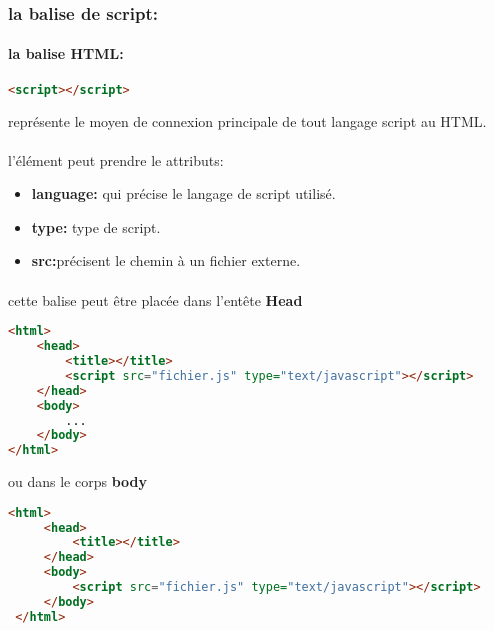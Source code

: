 \subsubsection{la balise de script:}
\paragraph{la balise HTML:} 
\begin{lstlisting}[language=html]
	<script></script>	
\end{lstlisting}
 représente le moyen de connexion principale de tout langage script au HTML.
\paragraph{}
l'élément peut prendre le attributs:
\begin{itemize}
	\item \textbf{language:} qui précise le langage de script utilisé.
	\item \textbf{type:} type de script.
	\item \textbf{src:}précisent le chemin à un fichier externe.
\end{itemize}
\paragraph{}
cette balise peut être placée dans l'entête \textbf{Head}
\begin{lstlisting}[language=html]
<html>
	<head>
		<title></title>
		<script src="fichier.js" type="text/javascript"></script>	
	</head>	
	<body>	
		...	
	</body>	
</html>
\end{lstlisting}
 ou dans le corps \textbf{body}
 \begin{lstlisting}[language=html]
 <html>
	 <head>
		 <title></title>	
	 </head>	
	 <body>	
		 <script src="fichier.js" type="text/javascript"></script>	
	 </body>	
 </html>
 \end{lstlisting}


